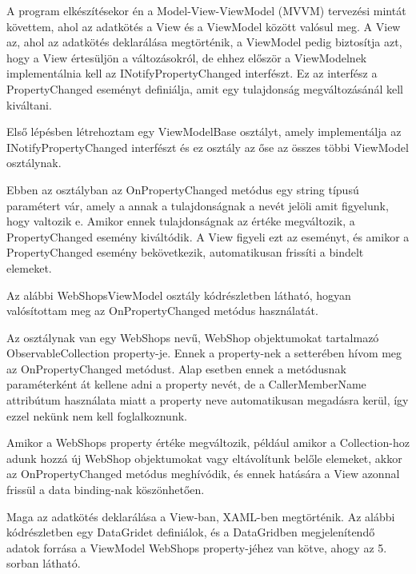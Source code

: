 \documentclass[
]{thesis-ekf}
\theoremstyle{definition}
\theoremstyle{remark}
\begin{document}
A program elkészítésekor én a Model-View-ViewModel (MVVM) tervezési mintát követtem, ahol az adatkötés a View és a ViewModel között valósul meg. A View az, ahol az adatkötés deklarálása megtörténik, a ViewModel pedig biztosítja azt, hogy a View értesüljön a változásokról, de ehhez először a ViewModelnek implementálnia kell az INotifyPropertyChanged interfészt. Ez az interfész a PropertyChanged eseményt definiálja, amit egy tulajdonság megváltozásánál kell kiváltani.

Első lépésben létrehoztam egy ViewModelBase osztályt, amely implementálja az INotifyPropertyChanged interfészt és ez osztály az őse az összes többi ViewModel osztálynak.



Ebben az osztályban az OnPropertyChanged metódus egy string típusú paramétert vár, amely a annak a tulajdonságnak a  nevét jelöli amit figyelunk, hogy valtozik e. Amikor ennek tulajdonságnak az értéke megváltozik, a PropertyChanged esemény kiváltódik. A View figyeli ezt az eseményt, és amikor a PropertyChanged esemény bekövetkezik, automatikusan frissíti a bindelt elemeket.

Az alábbi WebShopsViewModel osztály kódrészletben látható, hogyan valósítottam meg az OnPropertyChanged metódus használatát. 

Az osztálynak van egy WebShops nevű, WebShop objektumokat tartalmazó ObservableCollection property-je. Ennek a property-nek a setterében hívom meg az OnPropertyChanged metódust. Alap esetben ennek a metódusnak paraméterként át kellene adni a property nevét, de a CallerMemberName attribútum használata miatt a property neve automatikusan megadásra kerül, így ezzel nekünk nem kell foglalkoznunk.
\newpage


Amikor a WebShops property értéke megváltozik, például amikor a Collection-hoz adunk hozzá új WebShop objektumokat vagy eltávolítunk belőle elemeket, akkor az OnPropertyChanged metódus meghívódik, és ennek hatására a View azonnal frissül a data binding-nak köszönhetően. 

Maga az adatkötés deklarálása a View-ban, XAML-ben megtörténik. Az alábbi kódrészletben egy DataGridet definiálok, és a DataGridben megjelenítendő adatok forrása a ViewModel WebShops property-jéhez van kötve, ahogy az 5. sorban látható.
\end{document}
